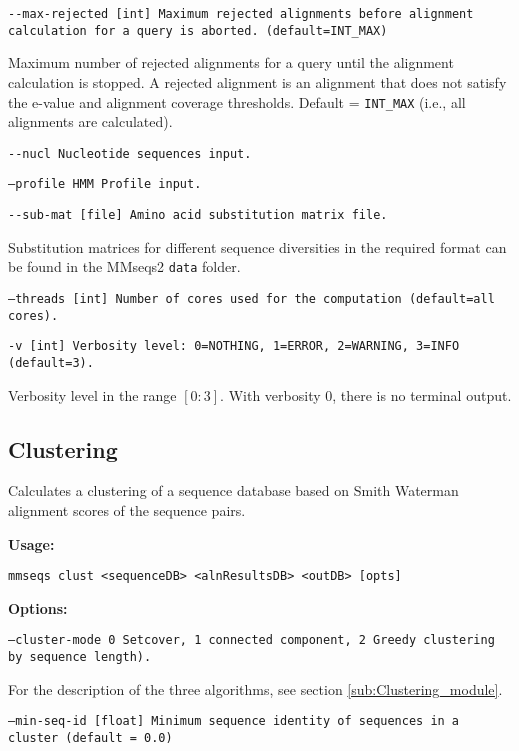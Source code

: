 \documentclass[11pt,a4paper]{scrreprt}
\begin{document}
\texttt{\small -{}-max-rejected {[}int{]} Maximum rejected alignments before alignment calculation for a query is aborted. (default=INT\_MAX)}{\small \par}

Maximum number of rejected alignments for a query until the alignment calculation is stopped. A rejected alignment is an alignment that does not satisfy the e-value and alignment coverage thresholds. Default = \texttt{INT\_MAX} (i.e., all alignments are calculated).

\texttt{\small -{}-nucl Nucleotide sequences input.}{\small \par}

\texttt{\small --profile HMM Profile input.}{\small \par}

\texttt{\small -{}-sub-mat {[}file{]} Amino acid substitution matrix file.}{\small \par}

Substitution matrices for different sequence diversities in the required format can be found in the MMseqs2 \texttt{data} folder.

\texttt{\small --threads {[}int{]} Number of cores used for the computation (default=all cores).}{\small \par}

\texttt{\small -v {[}int{]} Verbosity level: 0=NOTHING, 1=ERROR, 2=WARNING, 3=INFO (default=3).}{\small \par}

Verbosity level in the range $[0:3]$. With verbosity $0$, there is no terminal output.
\subsection{Clustering}
Calculates a clustering of a sequence database based on Smith Waterman alignment scores of the sequence pairs.

\textbf{Usage:}

\texttt{mmseqs clust <sequenceDB> <alnResultsDB> <outDB> {[}opts{]}}

\textbf{Options:}

\texttt{\small --cluster-mode 0 Setcover, 1 connected component, 2 Greedy clustering by sequence length).}{\small \par}

For the description of the three algorithms, see section \ref{sub:Clustering_module}.

\texttt{\small --min-seq-id {[}float{]} Minimum sequence identity of sequences in a cluster (default = 0.0)}{\small \par}
\end{document}
